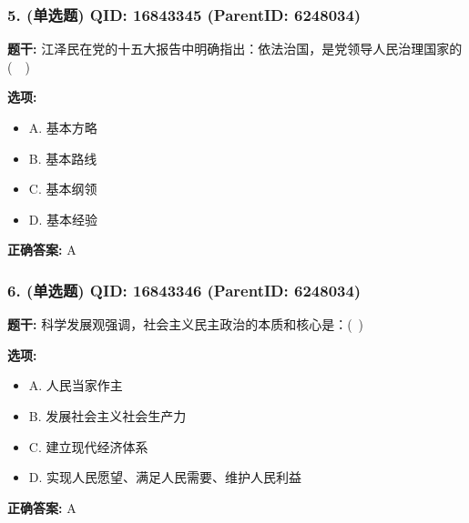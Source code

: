 \documentclass[12pt,UTF8]{ctexart}
\begin{document}
\subsubsection*{5. (单选题) \small QID: 16843345 (ParentID: 6248034)}

\textbf{题干:}
江泽民在党的十五大报告中明确指出：依法治国，是党领导人民治理国家的(  )



\textbf{选项:}
\begin{itemize}[leftmargin=*]

  \item A. 基本方略

  \item B. 基本路线

  \item C. 基本纲领

  \item D. 基本经验

\end{itemize}

\textbf{正确答案:}
A

\vspace{0.3em}\hrulefill\vspace{0.7em}

\subsubsection*{6. (单选题) \small QID: 16843346 (ParentID: 6248034)}

\textbf{题干:}
科学发展观强调，社会主义民主政治的本质和核心是：( )



\textbf{选项:}
\begin{itemize}[leftmargin=*]

  \item A. 人民当家作主

  \item B. 发展社会主义社会生产力

  \item C. 建立现代经济体系

  \item D. 实现人民愿望、满足人民需要、维护人民利益

\end{itemize}

\textbf{正确答案:}
A

\vspace{0.3em}\hrulefill\vspace{0.7em}
\end{document}
